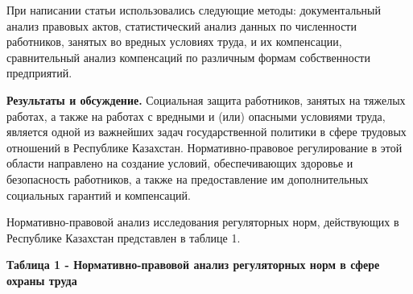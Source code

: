 При написании статьи использовались следующие методы: документальный
анализ правовых актов, статистический анализ данных по численности
работников, занятых во вредных условиях труда, и их компенсации,
сравнительный анализ компенсаций по различным формам собственности
предприятий.

{\bfseries Результаты и обсуждение.} Социальная защита работников, занятых
на тяжелых работах, а также на работах с вредными и (или) опасными
условиями труда, является одной из важнейших задач государственной
политики в сфере трудовых отношений в Республике Казахстан.
Нормативно-правовое регулирование в этой области направлено на создание
условий, обеспечивающих здоровье и безопасность работников, а также на
предоставление им дополнительных социальных гарантий и компенсаций.

Нормативно-правовой анализ исследования регуляторных норм, действующих в
Республике Казахстан представлен в таблице 1.

{\bfseries Таблица 1 - Нормативно-правовой анализ регуляторных норм в сфере
охраны труда}

